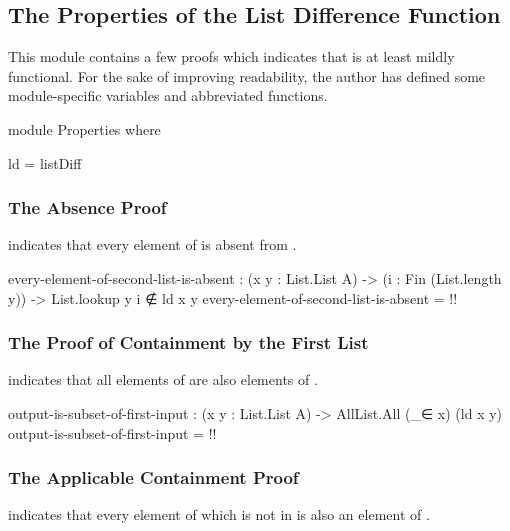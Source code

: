 \documentclass{report}
\begin{document}
\subsection{The Properties of the List Difference Function}
This module contains a few proofs which indicates that  is at least mildly functional.  For the sake of improving readability, the author has defined some module-specific variables and abbreviated functions.

\begin{code}
  module Properties where

    ld = listDiff
\end{code}

\subsubsection{The Absence Proof}
   indicates that every element of  is absent from   .

\begin{code}
    every-element-of-second-list-is-absent :
      (x y : List.List A) ->
      (i : Fin (List.length y)) ->
      List.lookup y i ∉ ld x y
    every-element-of-second-list-is-absent = {!!}
\end{code}

\subsubsection{The Proof of Containment by the First List}
   indicates that all elements of    are also elements of .

\begin{code}
    output-is-subset-of-first-input :
      (x y : List.List A) ->
      AllList.All (_∈ x) (ld x y)
    output-is-subset-of-first-input = {!!}
\end{code}

\subsubsection{The Applicable Containment Proof}
 indicates that every element of  which is not in  is also an element of   .
\end{document}
